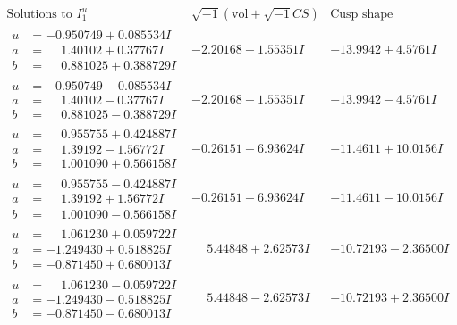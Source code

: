 \documentclass[1p]{elsarticle_modified}
\theoremstyle{definition}
\newcommand{\I}{\sqrt{-1}}
\begin{document}
$$\begin{array}{c|c|c}  
\text{Solutions to }I^u_{1}& \I (\text{vol} + \sqrt{-1}CS) & \text{Cusp shape}\\
 \hline 
\begin{aligned}
u &= -0.950749 + 0.085534 I \\
a &= \phantom{-}1.40102 + 0.37767 I \\
b &= \phantom{-}0.881025 + 0.388729 I\end{aligned}
 & -2.20168 - 1.55351 I & -13.9942 + 4.5761 I \\ \hline\begin{aligned}
u &= -0.950749 - 0.085534 I \\
a &= \phantom{-}1.40102 - 0.37767 I \\
b &= \phantom{-}0.881025 - 0.388729 I\end{aligned}
 & -2.20168 + 1.55351 I & -13.9942 - 4.5761 I \\ \hline\begin{aligned}
u &= \phantom{-}0.955755 + 0.424887 I \\
a &= \phantom{-}1.39192 - 1.56772 I \\
b &= \phantom{-}1.001090 + 0.566158 I\end{aligned}
 & -0.26151 - 6.93624 I & -11.4611 + 10.0156 I \\ \hline\begin{aligned}
u &= \phantom{-}0.955755 - 0.424887 I \\
a &= \phantom{-}1.39192 + 1.56772 I \\
b &= \phantom{-}1.001090 - 0.566158 I\end{aligned}
 & -0.26151 + 6.93624 I & -11.4611 - 10.0156 I \\ \hline\begin{aligned}
u &= \phantom{-}1.061230 + 0.059722 I \\
a &= -1.249430 + 0.518825 I \\
b &= -0.871450 + 0.680013 I\end{aligned}
 & \phantom{-}5.44848 + 2.62573 I & -10.72193 - 2.36500 I \\ \hline\begin{aligned}
u &= \phantom{-}1.061230 - 0.059722 I \\
a &= -1.249430 - 0.518825 I \\
b &= -0.871450 - 0.680013 I\end{aligned}
 & \phantom{-}5.44848 - 2.62573 I & -10.72193 + 2.36500 I \\ \hline\begin{aligned}

\end{aligned}
\end{array}$$
\end{document}

